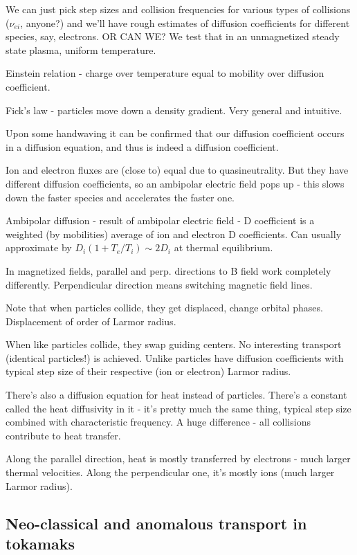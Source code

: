 \documentclass[PlasmaNotes.tex]{subfiles}
\begin{document}
  We can just pick step sizes and collision frequencies for various types of collisions ($\nu_{ei}$, anyone?) and we'll have rough estimates of diffusion coefficients for different species, say, electrons. OR CAN WE? We test that in an unmagnetized steady state plasma, uniform temperature. 
  
  Einstein relation - charge over temperature equal to mobility over diffusion coefficient.
  
  Fick's law - particles move down a density gradient. Very general and intuitive.
  
  Upon some handwaving it can be confirmed that our diffusion coefficient occurs in a diffusion equation, and thus is indeed a diffusion coefficient.
  
  Ion and electron fluxes are (close to) equal due to quasineutrality. But they have different diffusion coefficients, so an ambipolar electric field pops up - this slows down the faster species and accelerates the faster one.
  
  Ambipolar diffusion - result of ambipolar electric field - D coefficient is a weighted (by mobilities) average of ion and electron D coefficients. Can usually approximate by $D_i (1+T_e/T_i) \sim 2 D_i$ at thermal equilibrium.
  
  In magnetized fields, parallel and perp. directions to B field work completely differently. Perpendicular direction means switching magnetic field lines.
  
  Note that when particles collide, they get displaced, change orbital phases. Displacement of order of Larmor radius.
  
  When like particles collide, they swap guiding centers. No interesting transport (identical particles!) is achieved. Unlike particles have diffusion coefficients with typical step size of their respective (ion or electron) Larmor radius.
  
  There's also a diffusion equation for heat instead of particles. There's a constant called the heat diffusivity in it - it's pretty much the same thing, typical step size combined with characteristic frequency. A huge difference - all collisions contribute to heat transfer.
  
  Along the parallel direction, heat is mostly transferred by electrons - much larger thermal velocities. Along the perpendicular one, it's mostly ions (much larger Larmor radius).

\subsection{Neo-classical and anomalous transport in tokamaks}
\end{document}

